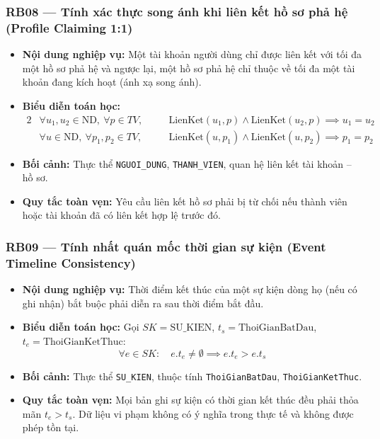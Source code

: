 \subsubsection{RB08 --- Tính xác thực song ánh khi liên kết hồ sơ phả hệ (Profile Claiming 1:1)}
\begin{itemize}
    \item \textbf{Nội dung nghiệp vụ:} Một tài khoản người dùng chỉ được liên kết với tối đa một hồ sơ phả hệ và ngược lại, một hồ sơ phả hệ chỉ thuộc về tối đa một tài khoản đang kích hoạt (ánh xạ song ánh).
    \item \textbf{Biểu diễn toán học:}
    \begin{alignat}{2}
        &\forall u_1, u_2 \in \text{ND},\ \forall p \in TV, \quad
        &&\text{LienKet}(u_1, p) \land \text{LienKet}(u_2, p) \implies u_1 = u_2 \\[3pt]
        &\forall u \in \text{ND},\ \forall p_1, p_2 \in TV, \quad
        &&\text{LienKet}(u, p_1) \land \text{LienKet}(u, p_2) \implies p_1 = p_2
    \end{alignat}
    \item \textbf{Bối cảnh:} Thực thể \texttt{NGUOI\_DUNG}, \texttt{THANH\_VIEN}, quan hệ liên kết tài khoản -- hồ sơ.
    \item \textbf{Quy tắc toàn vẹn:} Yêu cầu liên kết hồ sơ phải bị từ chối nếu thành viên hoặc tài khoản đã có liên kết hợp lệ trước đó.
\end{itemize}

\subsubsection{RB09 --- Tính nhất quán mốc thời gian sự kiện (Event Timeline Consistency)}
\begin{itemize}
    \item \textbf{Nội dung nghiệp vụ:} Thời điểm kết thúc của một sự kiện dòng họ (nếu có ghi nhận) bắt buộc phải diễn ra sau thời điểm bắt đầu.
    \item \textbf{Biểu diễn toán học:} Gọi $SK = \text{SU\_KIEN}$, $t_s = \text{ThoiGianBatDau}$, $t_e = \text{ThoiGianKetThuc}$:
    \begin{equation}
        \forall e \in SK: \quad
        e.t_e \ne \emptyset \implies e.t_e > e.t_s
    \end{equation}
    \item \textbf{Bối cảnh:} Thực thể \texttt{SU\_KIEN}, thuộc tính \texttt{ThoiGianBatDau}, \texttt{ThoiGianKetThuc}.
    \item \textbf{Quy tắc toàn vẹn:} Mọi bản ghi sự kiện có thời gian kết thúc đều phải thỏa mãn $t_e > t_s$. Dữ liệu vi phạm không có ý nghĩa trong thực tế và không được phép tồn tại.
\end{itemize}


